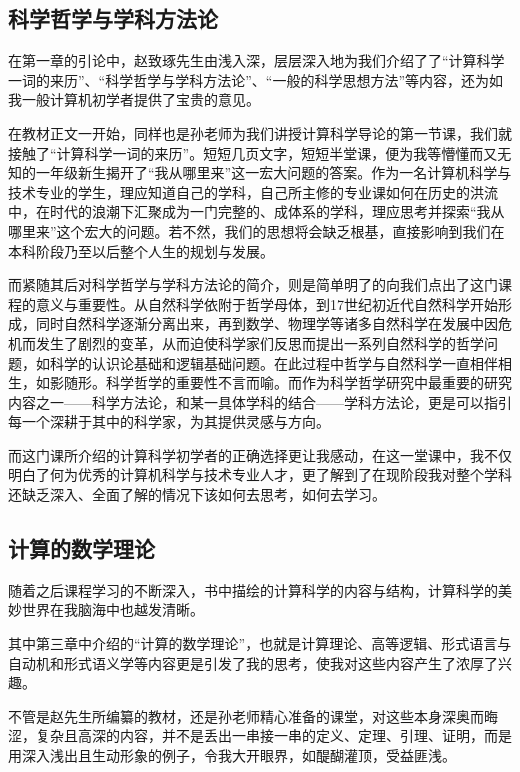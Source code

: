 \documentclass{article}
\begin{document}
\subsection{科学哲学与学科方法论}
在第一章的引论中，赵致琢先生由浅入深，层层深入地为我们介绍了了“计算科学一词的来历”、“科学哲学与学科方法论”、“一般的科学思想方法”等内容，还为如我一般计算机初学者提供了宝贵的意见。\par
在教材正文一开始，同样也是孙老师为我们讲授计算科学导论的第一节课，我们就接触了“计算科学一词的来历”。短短几页文字，短短半堂课，便为我等懵懂而又无知的一年级新生揭开了“我从哪里来”这一宏大问题的答案。作为一名计算机科学与技术专业的学生，理应知道自己的学科，自己所主修的专业课如何在历史的洪流中，在时代的浪潮下汇聚成为一门完整的、成体系的学科，理应思考并探索“我从哪里来”这个宏大的问题。若不然，我们的思想将会缺乏根基，直接影响到我们在本科阶段乃至以后整个人生的规划与发展。\par
而紧随其后对科学哲学与学科方法论的简介，则是简单明了的向我们点出了这门课程的意义与重要性。从自然科学依附于哲学母体，到17世纪初近代自然科学开始形成，同时自然科学逐渐分离出来，再到数学、物理学等诸多自然科学在发展中因危机而发生了剧烈的变革，从而迫使科学家们反思而提出一系列自然科学的哲学问题，如科学的认识论基础和逻辑基础问题。在此过程中哲学与自然科学一直相伴相生，如影随形。科学哲学的重要性不言而喻。而作为科学哲学研究中最重要的研究内容之一——科学方法论，和某一具体学科的结合——学科方法论，更是可以指引每一个深耕于其中的科学家，为其提供灵感与方向。\par
而这门课所介绍的计算科学初学者的正确选择更让我感动，在这一堂课中，我不仅明白了何为优秀的计算机科学与技术专业人才，更了解到了在现阶段我对整个学科还缺乏深入、全面了解的情况下该如何去思考，如何去学习。

\subsection{计算的数学理论}
随着之后课程学习的不断深入，书中描绘的计算科学的内容与结构，计算科学的美妙世界在我脑海中也越发清晰。\par
其中第三章中介绍的“计算的数学理论”，也就是计算理论、高等逻辑、形式语言与自动机和形式语义学等内容更是引发了我的思考，使我对这些内容产生了浓厚了兴趣。\par
不管是赵先生所编纂的教材，还是孙老师精心准备的课堂，对这些本身深奥而晦涩，复杂且高深的内容，并不是丢出一串接一串的定义、定理、引理、证明，而是用深入浅出且生动形象的例子，令我大开眼界，如醍醐灌顶，受益匪浅。
\end{document}
